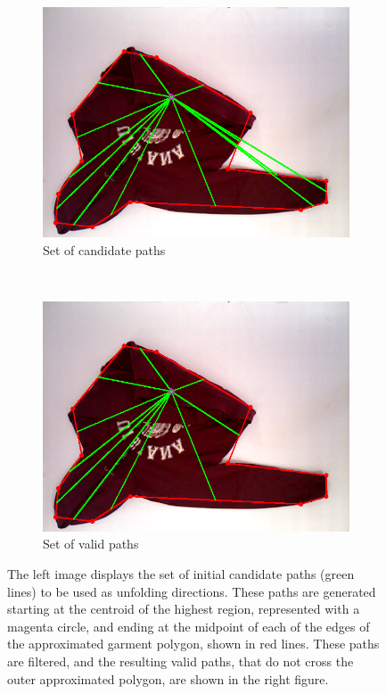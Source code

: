 \begin{figure}[htbp]
	\centering
    \begin{subfigure}[l]{0.49\textwidth}
	    \centering
    	\includegraphics[width=\textwidth]
    	{figures/paths_candidate.png}
    	\caption{Set of candidate paths}
	\end{subfigure}
	~
    \begin{subfigure}[r]{0.49\textwidth}
	    \centering
    	\includegraphics[width=\textwidth]
    	{figures/paths_valid.png}
    	\caption{Set of valid paths}
	\end{subfigure} 
    \caption{The left image displays the set of initial candidate paths (green lines) to be used as unfolding directions. These paths are generated starting at the centroid of the highest region, represented with a magenta circle, and ending at the midpoint of each of the edges of the approximated garment polygon, shown in red lines. These paths are filtered, and the resulting valid paths, that do not cross the outer approximated polygon, are shown in the right figure.}
    \label{fig:candidate_paths}
\end{figure}


